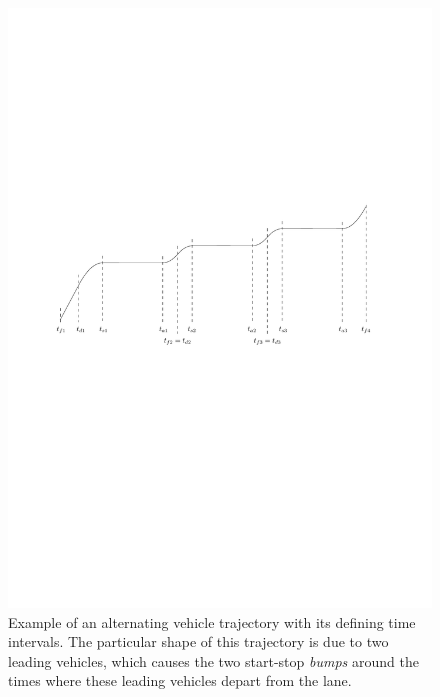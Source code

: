 \documentclass[a4paper]{report}
\theoremstyle{definition}
\theoremstyle{plain}
\begin{document}
\begin{figure}
  \centering
  \includegraphics[scale=0.9]{figures/motion/tandem_trajectory}
  \caption{Example of an alternating vehicle trajectory with its defining time
    intervals. The particular shape of this trajectory is due to two leading
    vehicles, which causes the two start-stop \emph{bumps} around the times where these
    leading vehicles depart from the lane.}
  \label{fig:tandem_trajectory}
\end{figure}
\end{document}
